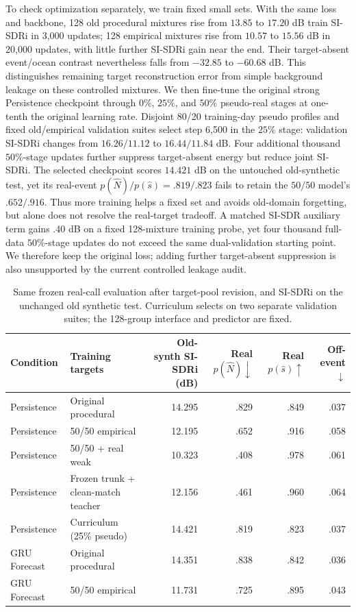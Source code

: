 \documentclass[conference]{IEEEtran}
\begin{document}
To check optimization separately, we train fixed small sets. With the same
loss and backbone, 128 old procedural mixtures rise from $13.85$ to $17.20$ dB
train SI-SDRi in 3,000 updates; 128 empirical mixtures rise from $10.57$ to
$15.56$ dB in 20,000 updates, with little further SI-SDRi gain near the end.
Their target-absent event/ocean contrast nevertheless falls from $-32.85$ to
$-60.68$ dB. This distinguishes remaining target reconstruction error from
simple background leakage on these controlled mixtures. We then fine-tune the
original strong Persistence checkpoint through $0\%$, $25\%$, and $50\%$
pseudo-real stages at one-tenth the original learning rate. Disjoint 80/20
training-day pseudo profiles and fixed old/empirical validation suites select
step 6,500 in the $25\%$ stage: validation SI-SDRi changes from
$16.26/11.12$ to $16.44/11.84$ dB. Four additional thousand $50\%$-stage
updates further suppress target-absent energy but reduce joint SI-SDRi. The
selected checkpoint scores $14.421$ dB on the untouched old-synthetic test,
yet its real-event $p(\hat N)/p(\hat s)=.819/.823$ fails to retain the
$50/50$ model's $.652/.916$. Thus more training helps a fixed set and avoids
old-domain forgetting, but alone does not resolve the real-target tradeoff.
A matched SI-SDR auxiliary term gains $.40$ dB on a fixed 128-mixture training
probe, yet four thousand full-data $50\%$-stage updates do not exceed the
same dual-validation starting point. We therefore keep the original loss;
adding further target-absent suppression is also unsupported by the current
controlled leakage audit.

\begin{table}[t]
\caption{Same frozen real-call evaluation after target-pool revision, and
SI-SDRi on the unchanged old synthetic test. Curriculum selects on two
separate validation suites; the 128-group interface and predictor are fixed.}
\label{tab:empirical}\centering\footnotesize
\begin{tabular}{llrrrr}
\toprule
Condition & Training targets & Old-synth SI-SDRi (dB) & Real $p(\hat N)\downarrow$ & Real $p(\hat s)\uparrow$ & Off-event$\downarrow$\\
\midrule
Persistence & Original procedural &14.295&.829&.849&.037\\
Persistence & 50/50 empirical &12.195&.652&.916&.058\\
Persistence & 50/50 + real weak &10.323&.408&.978&.061\\
Persistence & Frozen trunk + clean-match teacher &12.156&.461&.960&.064\\
Persistence & Curriculum (25\% pseudo) &14.421&.819&.823&.037\\
GRU Forecast & Original procedural &14.351&.838&.842&.036\\
GRU Forecast & 50/50 empirical &11.731&.725&.895&.043\\
\bottomrule
\end{tabular}
\end{table}
\end{document}
